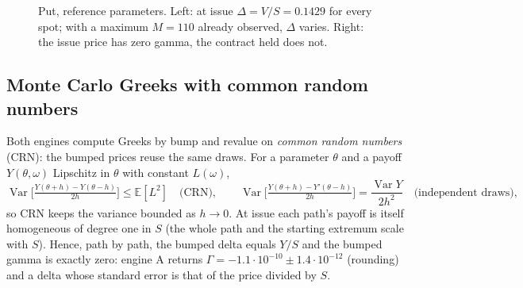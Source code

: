 \documentclass[11pt,a4paper]{article}
\theoremstyle{remark}
\newcommand{\E}{\mathbb{E}}
\begin{document}
\begin{figure}[ht]\centering
{}\hfill
{}
\caption{Put, reference parameters. Left: at issue $\Delta=V/S=0.1429$ for every spot; with a maximum $M=110$ already observed,
$\Delta$ varies. Right: the issue price has zero gamma, the contract held does not.}\label{fig:homog}
\end{figure}

\subsection{Monte Carlo Greeks with common random numbers}
Both engines compute Greeks by bump and revalue on \emph{common random numbers} (CRN): the bumped prices reuse the same draws.
For a parameter $\theta$ and a payoff $Y(\theta,\omega)$ Lipschitz in $\theta$ with constant $L(\omega)$,
\[
  \operatorname{Var}\Big[\tfrac{Y(\theta+h)-Y(\theta-h)}{2h}\Big]\le\E[L^2]\quad\text{(CRN)},\qquad
  \operatorname{Var}\Big[\tfrac{Y(\theta+h)-Y'(\theta-h)}{2h}\Big]=\frac{\operatorname{Var}Y}{2h^2}\quad\text{(independent draws)},
\]
so CRN keeps the variance bounded as $h\to0$. At issue each path's payoff is itself homogeneous of degree one in $S$ (the
whole path and the starting extremum scale with $S$). Hence, path by path, the bumped delta equals $Y/S$ and the bumped gamma
is exactly zero: engine A returns $\Gamma=-1.1\cdot10^{-10}\pm1.4\cdot10^{-12}$ (rounding) and a delta whose standard error is
that of the price divided by $S$.
\end{document}
